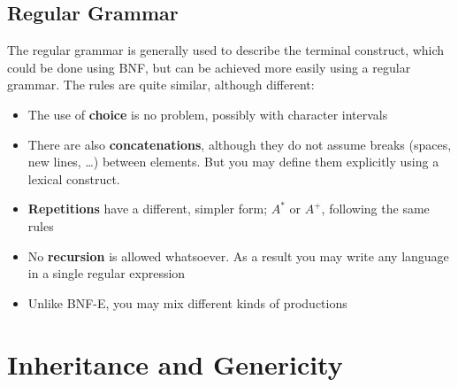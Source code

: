 \documentclass[a4paper]{article}
\begin{document}
\subsection{Regular Grammar}
The regular grammar is generally used to describe the terminal construct, which could be done using BNF, but can be achieved more easily using a regular grammar. The rules are quite similar, although different:
\begin{itemize}
\item The use of \textbf{choice} is no problem, possibly with character intervals
\item There are also \textbf{concatenations}, although they do not assume breaks (spaces, new lines, \dots) between elements. But you may define them explicitly using a lexical construct.
\item \textbf{Repetitions} have a different, simpler form; $A^*$ or $A^+$, following the same rules
\item No \textbf{recursion} is allowed whatsoever. As a result you may write any language in a single regular expression
\item Unlike BNF-E, you may mix different kinds of productions 
\end{itemize}

\section{Inheritance and Genericity}
\end{document}

